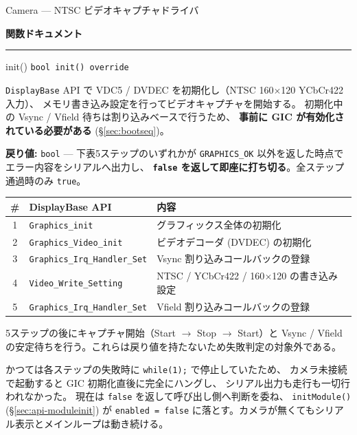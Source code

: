 \documentclass[a4paper,11pt,dvipdfmx]{jsarticle}
\makeatletter
\newcommand{\apisection}[1]{%
  \par\addvspace{4mm}%
  {\normalsize\bfseries\color{headerblue} #1}%
  \par\vspace{-1mm}%
  {\color{accentblue!40}\rule{\linewidth}{0.5pt}}%
  \par\nobreak\vspace{2mm}%
  \@afterheading
}
\makeatother
\begin{document}
\begin{apibox}{Camera --- NTSC ビデオキャプチャドライバ}
\apisection{関数ドキュメント}

\begin{funcblock}{init()}
\texttt{bool init() override}

\vspace{1.5mm}
\texttt{DisplayBase} API で VDC5 / DVDEC を初期化し（NTSC 160$\times$120 YCbCr422 入力）、
メモリ書き込み設定を行ってビデオキャプチャを開始する。
初期化中の Vsync / Vfield 待ちは割り込みベースで行うため、
\textbf{事前に GIC が有効化されている必要がある} (\hyperref[sec:bootseq]{§\ref*{sec:bootseq}})。

\vspace{1.5mm}
\textbf{戻り値:} \texttt{bool} --- 下表5ステップのいずれかが
\texttt{GRAPHICS\_OK} 以外を返した時点でエラー内容をシリアルへ出力し、
\textbf{\texttt{false} を返して即座に打ち切る}。全ステップ通過時のみ \texttt{true}。
\end{funcblock}

\begin{tabularx}{\textwidth}{c l X}
\toprule
\textbf{\#} & \textbf{DisplayBase API} & \textbf{内容} \\
\midrule
1 & \texttt{Graphics\_init}          & グラフィックス全体の初期化 \\
2 & \texttt{Graphics\_Video\_init}   & ビデオデコーダ (DVDEC) の初期化 \\
3 & \texttt{Graphics\_Irq\_Handler\_Set} & Vsync 割り込みコールバックの登録 \\
4 & \texttt{Video\_Write\_Setting}   & NTSC / YCbCr422 / 160$\times$120 の書き込み設定 \\
5 & \texttt{Graphics\_Irq\_Handler\_Set} & Vfield 割り込みコールバックの登録 \\
\bottomrule
\end{tabularx}

\vspace{2mm}
5ステップの後にキャプチャ開始（Start $\rightarrow$ Stop $\rightarrow$ Start）と
Vsync / Vfield の安定待ちを行う。これらは戻り値を持たないため失敗判定の対象外である。

\begin{notebox}[以前は失敗時に無限ループしていた]
かつては各ステップの失敗時に \texttt{while(1);} で停止していたため、
カメラ未接続で起動すると GIC 初期化直後に完全にハングし、
シリアル出力も走行も一切行われなかった。
現在は \texttt{false} を返して呼び出し側へ判断を委ね、
\texttt{initModule()} (\hyperref[sec:api-moduleinit]{§\ref*{sec:api-moduleinit}}) が
\texttt{enabled = false} に落とす。カメラが無くてもシリアル表示とメインループは動き続ける。
\end{notebox}


\end{apibox}
\end{document}
